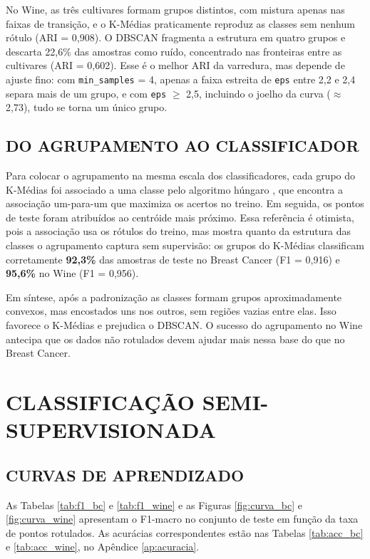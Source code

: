 No Wine, as três cultivares formam grupos distintos, com mistura apenas nas faixas de transição, e o K-Médias praticamente reproduz as classes sem nenhum rótulo (ARI = 0,908). O DBSCAN fragmenta a estrutura em quatro grupos e descarta 22,6\% das amostras como ruído, concentrado nas fronteiras entre as cultivares (ARI = 0,602). Esse é o melhor ARI da varredura, mas depende de ajuste fino: com \texttt{min\_samples} = 4, apenas a faixa estreita de \texttt{eps} entre 2,2 e 2,4 separa mais de um grupo, e com \texttt{eps} $\geq$ 2,5, incluindo o joelho da curva ($\approx$ 2,73), tudo se torna um único grupo.

\subsection{DO AGRUPAMENTO AO CLASSIFICADOR}

Para colocar o agrupamento na mesma escala dos classificadores, cada grupo do K-Médias foi associado a uma classe pelo algoritmo húngaro \citep{kuhn1955hungarian}, que encontra a associação um-para-um que maximiza os acertos no treino. Em seguida, os pontos de teste foram atribuídos ao centróide mais próximo. Essa referência é otimista, pois a associação usa os rótulos do treino, mas mostra quanto da estrutura das classes o agrupamento captura sem supervisão: os grupos do K-Médias classificam corretamente \textbf{92,3\%} das amostras de teste no Breast Cancer (F1 = 0,916) e \textbf{95,6\%} no Wine (F1 = 0,956).

Em síntese, após a padronização as classes formam grupos aproximadamente convexos, mas encostados uns nos outros, sem regiões vazias entre elas. Isso favorece o K-Médias e prejudica o DBSCAN. O sucesso do agrupamento no Wine antecipa que os dados não rotulados devem ajudar mais nessa base do que no Breast Cancer.

\section{CLASSIFICAÇÃO SEMI-SUPERVISIONADA}

\subsection{CURVAS DE APRENDIZADO}

As Tabelas \ref{tab:f1_bc} e \ref{tab:f1_wine} e as Figuras \ref{fig:curva_bc} e \ref{fig:curva_wine} apresentam o F1-macro no conjunto de teste em função da taxa de pontos rotulados. As acurácias correspondentes estão nas Tabelas \ref{tab:acc_bc} e \ref{tab:acc_wine}, no Apêndice \ref{ap:acuracia}.


